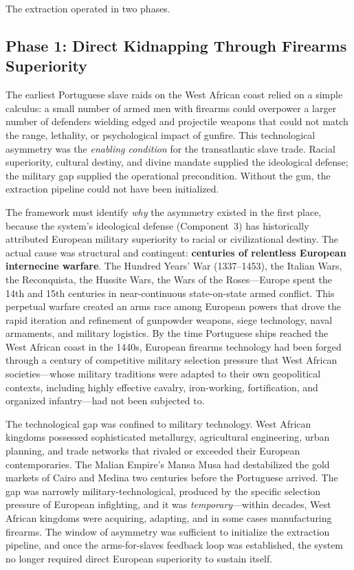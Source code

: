 The extraction operated in two phases.

\subsection{Phase 1: Direct Kidnapping Through Firearms Superiority}

The earliest Portuguese slave raids on the West African coast relied on a simple calculus: a small number of armed men with firearms could overpower a larger number of defenders wielding edged and projectile weapons that could not match the range, lethality, or psychological impact of gunfire. This technological asymmetry was the \textit{enabling condition} for the transatlantic slave trade. Racial superiority, cultural destiny, and divine mandate supplied the ideological defense; the military gap supplied the operational precondition. Without the gun, the extraction pipeline could not have been initialized.

The framework must identify \textit{why} the asymmetry existed in the first place, because the system's ideological defense (Component~3) has historically attributed European military superiority to racial or civilizational destiny. The actual cause was structural and contingent: \textbf{centuries of relentless European internecine warfare}. The Hundred Years' War (1337--1453), the Italian Wars, the Reconquista, the Hussite Wars, the Wars of the Roses---Europe spent the 14th and 15th centuries in near-continuous state-on-state armed conflict. This perpetual warfare created an arms race among European powers that drove the rapid iteration and refinement of gunpowder weapons, siege technology, naval armaments, and military logistics. By the time Portuguese ships reached the West African coast in the 1440s, European firearms technology had been forged through a century of competitive military selection pressure that West African societies---whose military traditions were adapted to their own geopolitical contexts, including highly effective cavalry, iron-working, fortification, and organized infantry---had not been subjected to.

The technological gap was confined to military technology. West African kingdoms possessed sophisticated metallurgy, agricultural engineering, urban planning, and trade networks that rivaled or exceeded their European contemporaries. The Malian Empire's Mansa Musa had destabilized the gold markets of Cairo and Medina two centuries before the Portuguese arrived. The gap was narrowly military-technological, produced by the specific selection pressure of European infighting, and it was \textit{temporary}---within decades, West African kingdoms were acquiring, adapting, and in some cases manufacturing firearms. The window of asymmetry was sufficient to initialize the extraction pipeline, and once the arms-for-slaves feedback loop was established, the system no longer required direct European superiority to sustain itself.

